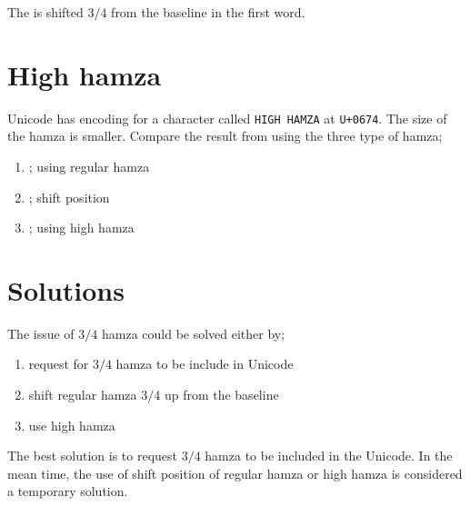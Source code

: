 \documentclass[12pt,a4paper]{IEEEconf}
\begin{document}
The  is shifted $3/4$ from the baseline in the first word. 

\section{High hamza}

Unicode has encoding for a character called \texttt{HIGH HAMZA} at \texttt{U+0674}. The size of the hamza is smaller. Compare the result from using the three type of hamza;
\begin{enumerate}
\item  {} ; using regular hamza
\item {} ; shift position
\item {} ; using high hamza
\end{enumerate}

\section{Solutions}

The issue of $3/4$ hamza could be solved either by;
\begin{enumerate}
\item request for $3/4$ hamza to be include in Unicode
\item shift regular hamza $3/4$ up from the baseline
\item use high hamza
\end{enumerate}

The best solution is to request $3/4$ hamza to be included in the Unicode. In the mean time, the use of shift position of regular hamza or high hamza is considered a temporary solution.
\end{document}
